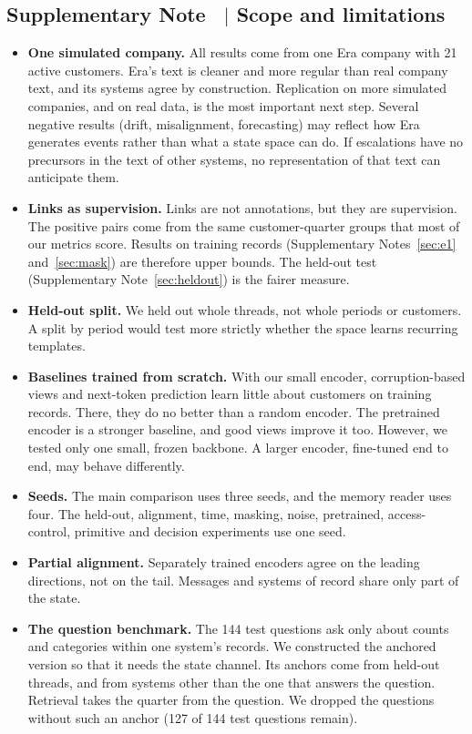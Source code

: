 \documentclass[11pt]{article}
\newcounter{suppnote}
\newcommand{\suppnote}[2]{\refstepcounter{suppnote}\label{#2}\subsection{Supplementary Note \thesuppnote\ $|$ #1}}
\begin{document}
\suppnote{Scope and limitations}{sec:limits}
\begin{itemize}
\item \textbf{One simulated company.} All results come from one Era company with 21 active customers. Era's text is cleaner and more regular than real company text, and its systems agree by construction. Replication on more simulated companies, and on real data, is the most important next step. Several negative results (drift, misalignment, forecasting) may reflect how Era generates events rather than what a state space can do. If escalations have no precursors in the text of other systems, no representation of that text can anticipate them.
\item \textbf{Links as supervision.} Links are not annotations, but they are supervision. The positive pairs come from the same customer-quarter groups that most of our metrics score. Results on training records (Supplementary Notes~\ref{sec:e1} and~\ref{sec:mask}) are therefore upper bounds. The held-out test (Supplementary Note~\ref{sec:heldout}) is the fairer measure.
\item \textbf{Held-out split.} We held out whole threads, not whole periods or customers. A split by period would test more strictly whether the space learns recurring templates.
\item \textbf{Baselines trained from scratch.} With our small encoder, corruption-based views and next-token prediction learn little about customers on training records. There, they do no better than a random encoder. The pretrained encoder is a stronger baseline, and good views improve it too. However, we tested only one small, frozen backbone. A larger encoder, fine-tuned end to end, may behave differently.
\item \textbf{Seeds.} The main comparison uses three seeds, and the memory reader uses four. The held-out, alignment, time, masking, noise, pretrained, access-control, primitive and decision experiments use one seed.
\item \textbf{Partial alignment.} Separately trained encoders agree on the leading directions, not on the tail. Messages and systems of record share only part of the state.
\item \textbf{The question benchmark.} The 144 test questions ask only about counts and categories within one system's records. We constructed the anchored version so that it needs the state channel. Its anchors come from held-out threads, and from systems other than the one that answers the question. Retrieval takes the quarter from the question. We dropped the questions without such an anchor (127 of 144 test questions remain).


\end{itemize}
\end{document}
